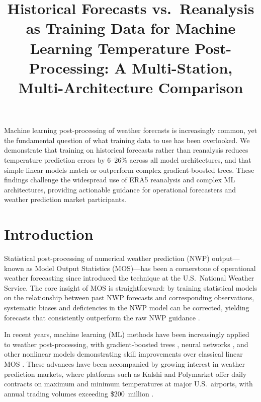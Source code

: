 \documentclass{ametsocV6.1}
\title{Historical Forecasts vs.\ Reanalysis as Training Data for Machine Learning
Temperature Post-Processing: A Multi-Station, Multi-Architecture Comparison}
\affiliation{\aff{a}{Amity Institute of Engineering Technology, Amity University Lucknow, Lucknow, India}\\
\aff{b}{Department of Computer Science, Boston University, Boston, USA}\\
\aff{c}{$<$Affiliation$>$}\\
\aff{d}{$<$Affiliation$>$}
}
\begin{document}
\maketitle

\linenumbers


\statement
Machine learning post-processing of weather forecasts is increasingly common,
yet the fundamental question of what training data to use has been overlooked.
We demonstrate that training on historical forecasts rather than reanalysis
reduces temperature prediction errors by 6--26\% across all model architectures,
and that simple linear models match or outperform complex gradient-boosted trees.
These findings challenge the widespread use of ERA5 reanalysis and complex ML
architectures, providing actionable guidance for operational forecasters and
weather prediction market participants.


\section{Introduction}
\label{sec:intro}

Statistical post-processing of numerical weather prediction (NWP) output---known
as Model Output Statistics (MOS)---has been a cornerstone of operational weather
forecasting since \citet{glahn1972mos} introduced the technique at the U.S.\
National Weather Service. The core insight of MOS is straightforward: by training
statistical models on the relationship between past NWP forecasts and corresponding
observations, systematic biases and deficiencies in the NWP model can be corrected,
yielding forecasts that consistently outperform the raw NWP guidance
\citep{carter1989mos, wilks2011statistical}.

In recent years, machine learning (ML) methods have been increasingly applied to
weather post-processing, with gradient-boosted trees
\citep{taillardat2016calibrated}, neural networks \citep{rasp2018neural}, and other
nonlinear models demonstrating skill improvements over classical linear MOS
\citep{vannitsem2021statistical, schulz2022machine}. These advances have been
accompanied by growing interest in weather prediction markets, where platforms
such as Kalshi and Polymarket offer daily contracts on maximum and minimum
temperatures at major U.S.\ airports, with annual trading volumes exceeding
\$200~million \citep{snowberg2013prediction}.
\end{document}
